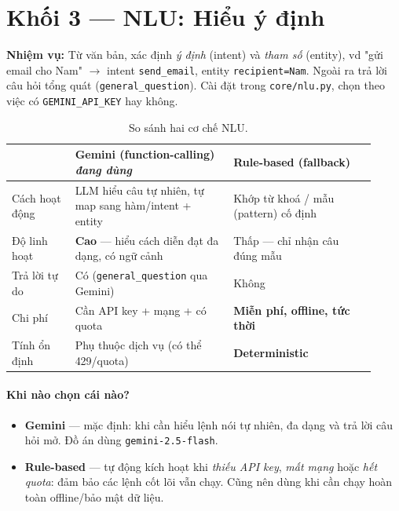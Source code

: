 \documentclass[12pt,a4paper]{article}
\newcommand{\role}[1]{\par\smallskip\noindent\textbf{\textcolor{hdr}{Nhiệm vụ:}} #1\par\smallskip}
\begin{document}
\section{Khối 3 --- NLU: Hiểu ý định}
\role{Từ văn bản, xác định \emph{ý định} (intent) và \emph{tham số} (entity), vd
"gửi email cho Nam" $\to$ intent \texttt{send\_email}, entity \texttt{recipient=Nam}.
Ngoài ra trả lời câu hỏi tổng quát (\texttt{general\_question}). Cài đặt trong
\texttt{core/nlu.py}, chọn theo việc có \texttt{GEMINI\_API\_KEY} hay không.}

\begin{table}[H]
\centering
\caption{So sánh hai cơ chế NLU.}
\small
\begin{tabular}{p{0.16\linewidth}p{0.40\linewidth}p{0.36\linewidth}}
\toprule
& \textbf{Gemini} (function-calling) \textit{đang dùng} & \textbf{Rule-based} (fallback) \\
\midrule
Cách hoạt động & LLM hiểu câu tự nhiên, tự map sang hàm/intent + entity & Khớp
từ khoá / mẫu (pattern) cố định \\
Độ linh hoạt & \textbf{Cao} --- hiểu cách diễn đạt đa dạng, có ngữ cảnh & Thấp ---
chỉ nhận câu đúng mẫu \\
Trả lời tự do & Có (\texttt{general\_question} qua Gemini) & Không \\
Chi phí & Cần API key + mạng + có quota & \textbf{Miễn phí, offline, tức thời} \\
Tính ổn định & Phụ thuộc dịch vụ (có thể 429/quota) & \textbf{Deterministic} \\
\bottomrule
\end{tabular}
\end{table}

\paragraph{Khi nào chọn cái nào?}
\begin{itemize}
  \item \textbf{Gemini} --- mặc định: khi cần hiểu lệnh nói tự nhiên, đa dạng và
  trả lời câu hỏi mở. Đồ án dùng \texttt{gemini-2.5-flash}.
  \item \textbf{Rule-based} --- tự động kích hoạt khi \emph{thiếu API key},
  \emph{mất mạng} hoặc \emph{hết quota}: đảm bảo các lệnh cốt lõi vẫn chạy. Cũng
  nên dùng khi cần chạy hoàn toàn offline/bảo mật dữ liệu.
\end{itemize}
\end{document}

